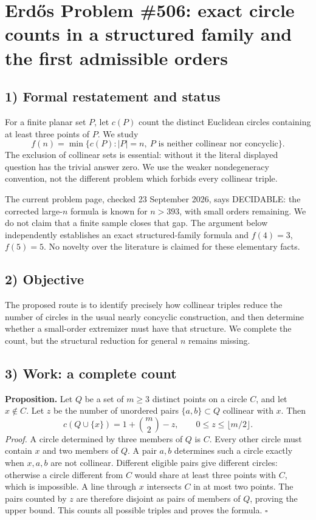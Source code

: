 \section{Erd\H{o}s Problem \#506: exact circle counts in a structured family and the first admissible orders}

\subsection*{1) Formal restatement and status}
For a finite planar set $P$, let $c(P)$ count the distinct Euclidean circles containing at least three points of $P$. We study
\[
 f(n)=\min\{c(P):|P|=n,\ P\text{ is neither collinear nor concyclic}\}.
\]
The exclusion of collinear sets is essential: without it the literal displayed question has the trivial answer zero. We use the weaker nondegeneracy convention, not the different problem which forbids every collinear triple.

The current problem page, checked 23 September 2026, says DECIDABLE: the corrected large-$n$ formula is known for $n>393$, with small orders remaining. We do not claim that a finite sample closes that gap. The argument below independently establishes an exact structured-family formula and $f(4)=3$, $f(5)=5$. No novelty over the literature is claimed for these elementary facts.

\subsection*{2) Objective}
The proposed route is to identify precisely how collinear triples reduce the number of circles in the usual nearly concyclic construction, and then determine whether a small-order extremizer must have that structure. We complete the count, but the structural reduction for general $n$ remains missing.

\subsection*{3) Work: a complete count}
\textbf{Proposition.} Let $Q$ be a set of $m\geq3$ distinct points on a circle $C$, and let $x\notin C$. Let $z$ be the number of unordered pairs $\{a,b\}\subset Q$ collinear with $x$. Then
\[
 c(Q\cup\{x\})=1+\binom m2-z,
 \qquad 0\leq z\leq\lfloor m/2\rfloor.
\]
\emph{Proof.} A circle determined by three members of $Q$ is $C$. Every other circle must contain $x$ and two members of $Q$. A pair $a,b$ determines such a circle exactly when $x,a,b$ are not collinear. Different eligible pairs give different circles: otherwise a circle different from $C$ would share at least three points with $C$, which is impossible. A line through $x$ intersects $C$ in at most two points. The pairs counted by $z$ are therefore disjoint as pairs of members of $Q$, proving the upper bound. This counts all possible triples and proves the formula. $\square$

